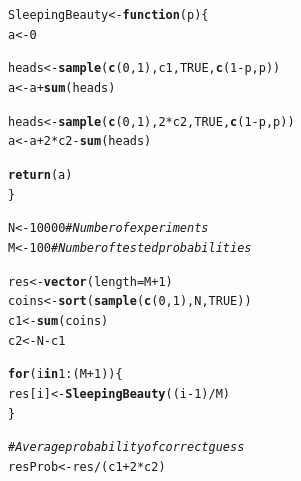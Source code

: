 \documentclass{article}\usepackage[]{graphicx}\usepackage[]{color}
\makeatletter
\newcommand{\hlnum}[1]{\textcolor[rgb]{0.686,0.059,0.569}{#1}}%
\newcommand{\hlcom}[1]{\textcolor[rgb]{0.678,0.584,0.686}{\textit{#1}}}%
\newcommand{\hlopt}[1]{\textcolor[rgb]{0,0,0}{#1}}%
\newcommand{\hlstd}[1]{\textcolor[rgb]{0.345,0.345,0.345}{#1}}%
\newcommand{\hlkwa}[1]{\textcolor[rgb]{0.161,0.373,0.58}{\textbf{#1}}}%
\newcommand{\hlkwb}[1]{\textcolor[rgb]{0.69,0.353,0.396}{#1}}%
\newcommand{\hlkwc}[1]{\textcolor[rgb]{0.333,0.667,0.333}{#1}}%
\newcommand{\hlkwd}[1]{\textcolor[rgb]{0.737,0.353,0.396}{\textbf{#1}}}%
\newenvironment{kframe}{%
 \def\at@end@of@kframe{}%
 \ifinner\ifhmode%
  \def\at@end@of@kframe{\end{minipage}}%
  \begin{minipage}{\columnwidth}%
 \fi\fi%
 \def\FrameCommand##1{\hskip\@totalleftmargin \hskip-\fboxsep
 \colorbox{shadecolor}{##1}\hskip-\fboxsep
     \hskip-\linewidth \hskip-\@totalleftmargin \hskip\columnwidth}%
 \MakeFramed {\advance\hsize-\width
   \@totalleftmargin\z@ \linewidth\hsize
   \@setminipage}}%
 {\par\unskip\endMakeFramed%
 \at@end@of@kframe}
\newenvironment{knitrout}{}{} %
\makeatother
\begin{document}
\begin{knitrout}
\color{fgcolor}\begin{kframe}
\begin{alltt}
\hlstd{SleepingBeauty} \hlkwb{<-} \hlkwa{function}\hlstd{(}\hlkwc{p}\hlstd{) \{}
  \hlstd{a} \hlkwb{<-} \hlnum{0}

  \hlstd{heads} \hlkwb{<-} \hlkwd{sample}\hlstd{(}\hlkwd{c}\hlstd{(}\hlnum{0}\hlstd{,}\hlnum{1}\hlstd{), c1,} \hlnum{TRUE}\hlstd{,} \hlkwd{c}\hlstd{(}\hlnum{1}\hlopt{-}\hlstd{p,p))}
  \hlstd{a} \hlkwb{<-} \hlstd{a} \hlopt{+} \hlkwd{sum}\hlstd{(heads)}

  \hlstd{heads} \hlkwb{<-} \hlkwd{sample}\hlstd{(}\hlkwd{c}\hlstd{(}\hlnum{0}\hlstd{,}\hlnum{1}\hlstd{),} \hlnum{2}\hlopt{*}\hlstd{c2,} \hlnum{TRUE}\hlstd{,} \hlkwd{c}\hlstd{(}\hlnum{1}\hlopt{-}\hlstd{p,p))}
  \hlstd{a} \hlkwb{<-} \hlstd{a} \hlopt{+} \hlnum{2}\hlopt{*}\hlstd{c2}\hlopt{-}\hlkwd{sum}\hlstd{(heads)}

  \hlkwd{return}\hlstd{(a)}
\hlstd{\}}

\hlstd{N} \hlkwb{<-} \hlnum{10000} \hlcom{# Number of experiments}
\hlstd{M} \hlkwb{<-} \hlnum{100}   \hlcom{# Number of tested probabilities}

\hlstd{res} \hlkwb{<-} \hlkwd{vector}\hlstd{(}\hlkwc{length}\hlstd{=M}\hlopt{+}\hlnum{1}\hlstd{)}
\hlstd{coins} \hlkwb{<-} \hlkwd{sort}\hlstd{(}\hlkwd{sample}\hlstd{(}\hlkwd{c}\hlstd{(}\hlnum{0}\hlstd{,}\hlnum{1}\hlstd{), N,} \hlnum{TRUE}\hlstd{))}
\hlstd{c1} \hlkwb{<-} \hlkwd{sum}\hlstd{(coins)}
\hlstd{c2} \hlkwb{<-} \hlstd{N} \hlopt{-} \hlstd{c1}

\hlkwa{for} \hlstd{(i} \hlkwa{in} \hlnum{1}\hlopt{:}\hlstd{(M}\hlopt{+}\hlnum{1}\hlstd{)) \{}
  \hlstd{res[i]} \hlkwb{<-} \hlkwd{SleepingBeauty}\hlstd{((i}\hlopt{-}\hlnum{1}\hlstd{)}\hlopt{/}\hlstd{M)}
\hlstd{\}}

\hlcom{# Average probability of correct guess}
\hlstd{resProb} \hlkwb{<-} \hlstd{res} \hlopt{/} \hlstd{(c1} \hlopt{+} \hlnum{2}\hlopt{*}\hlstd{c2)}


\end{alltt}
\end{kframe}
\end{knitrout}
\end{document}
